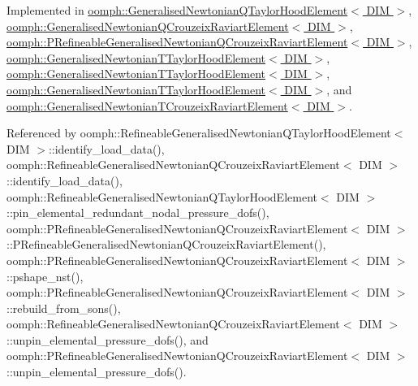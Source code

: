 Implemented in \hyperlink{classoomph_1_1GeneralisedNewtonianQTaylorHoodElement_ab52245df561c368a6f0709374dba7136}{oomph\+::\+Generalised\+Newtonian\+Q\+Taylor\+Hood\+Element$<$ D\+I\+M $>$}, \hyperlink{classoomph_1_1GeneralisedNewtonianQCrouzeixRaviartElement_afdd70f9e267fd6acfb87c9a842c7812c}{oomph\+::\+Generalised\+Newtonian\+Q\+Crouzeix\+Raviart\+Element$<$ D\+I\+M $>$}, \hyperlink{classoomph_1_1PRefineableGeneralisedNewtonianQCrouzeixRaviartElement_a68ed322582ba179cd0845bbd498e11b9}{oomph\+::\+P\+Refineable\+Generalised\+Newtonian\+Q\+Crouzeix\+Raviart\+Element$<$ D\+I\+M $>$}, \hyperlink{classoomph_1_1GeneralisedNewtonianTTaylorHoodElement_aad5747c86300924ad3dfdf0144fa4c74}{oomph\+::\+Generalised\+Newtonian\+T\+Taylor\+Hood\+Element$<$ D\+I\+M $>$}, \hyperlink{classoomph_1_1GeneralisedNewtonianTTaylorHoodElement_a7097f7c345da00bebde2b6826ed8559b}{oomph\+::\+Generalised\+Newtonian\+T\+Taylor\+Hood\+Element$<$ D\+I\+M $>$}, \hyperlink{classoomph_1_1GeneralisedNewtonianTTaylorHoodElement_a290fdfa0f87a6d4a52823c082c298b4f}{oomph\+::\+Generalised\+Newtonian\+T\+Taylor\+Hood\+Element$<$ D\+I\+M $>$}, and \hyperlink{classoomph_1_1GeneralisedNewtonianTCrouzeixRaviartElement_a9292803fedb1000c418070b5c459834b}{oomph\+::\+Generalised\+Newtonian\+T\+Crouzeix\+Raviart\+Element$<$ D\+I\+M $>$}.



Referenced by oomph\+::\+Refineable\+Generalised\+Newtonian\+Q\+Taylor\+Hood\+Element$<$ D\+I\+M $>$\+::identify\+\_\+load\+\_\+data(), oomph\+::\+Refineable\+Generalised\+Newtonian\+Q\+Crouzeix\+Raviart\+Element$<$ D\+I\+M $>$\+::identify\+\_\+load\+\_\+data(), oomph\+::\+Refineable\+Generalised\+Newtonian\+Q\+Taylor\+Hood\+Element$<$ D\+I\+M $>$\+::pin\+\_\+elemental\+\_\+redundant\+\_\+nodal\+\_\+pressure\+\_\+dofs(), oomph\+::\+P\+Refineable\+Generalised\+Newtonian\+Q\+Crouzeix\+Raviart\+Element$<$ D\+I\+M $>$\+::\+P\+Refineable\+Generalised\+Newtonian\+Q\+Crouzeix\+Raviart\+Element(), oomph\+::\+P\+Refineable\+Generalised\+Newtonian\+Q\+Crouzeix\+Raviart\+Element$<$ D\+I\+M $>$\+::pshape\+\_\+nst(), oomph\+::\+P\+Refineable\+Generalised\+Newtonian\+Q\+Crouzeix\+Raviart\+Element$<$ D\+I\+M $>$\+::rebuild\+\_\+from\+\_\+sons(), oomph\+::\+Refineable\+Generalised\+Newtonian\+Q\+Crouzeix\+Raviart\+Element$<$ D\+I\+M $>$\+::unpin\+\_\+elemental\+\_\+pressure\+\_\+dofs(), and oomph\+::\+P\+Refineable\+Generalised\+Newtonian\+Q\+Crouzeix\+Raviart\+Element$<$ D\+I\+M $>$\+::unpin\+\_\+elemental\+\_\+pressure\+\_\+dofs().

\mbox{\label{classoomph_1_1GeneralisedNewtonianNavierStokesEquations_a25757f39f6d242dd96cf0856ecd1b58c}} 
